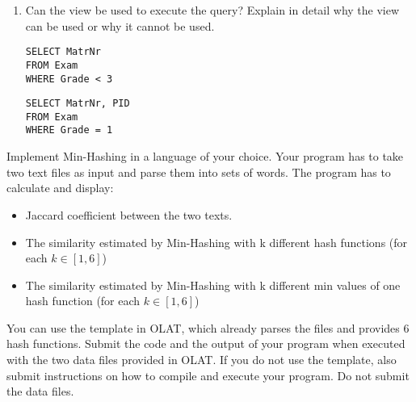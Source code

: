 \begin{enumerate}
\begin{enumerate}
  \end{enumerate}

\item 
 Can the view be used to execute the query? Explain in detail why the view can be used or why it cannot be used.

\begin{minipage}{0.4\columnwidth}
\end{minipage}
\begin{minipage}{0.4\columnwidth}
\end{minipage}

\begin{minipage}{0.4\columnwidth}
\begin{verbatim}
SELECT MatrNr
FROM Exam
WHERE Grade < 3

\end{verbatim}
\end{minipage}
\begin{minipage}{0.4\columnwidth}
\begin{verbatim}
SELECT MatrNr, PID
FROM Exam
WHERE Grade = 1
\end{verbatim}
\end{minipage}

\end{enumerate}

\newpage

Implement Min-Hashing in a language of your choice.
Your program has to take two text files as input and parse them into sets of words.
The program has to calculate and display:
\begin{itemize}
\item Jaccard coefficient between the two texts.
\item The similarity estimated by Min-Hashing with k different hash functions (for each $k \in [1,6]$)
\item The similarity estimated by Min-Hashing with k different min values of one hash function (for each $k \in [1,6]$)
\end{itemize}

You can use the template in OLAT, which already parses the files and provides 6 hash functions.
Submit the code and the output of your program when executed with the two data files provided in OLAT.
If you do not use the template, also submit instructions on how to compile and execute your program.
Do not submit the data files.

